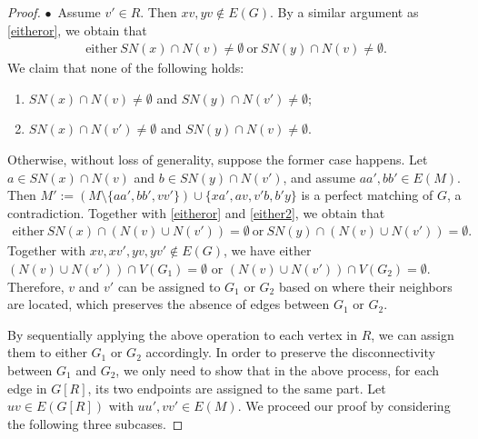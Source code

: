\documentclass[10pt,a4paper]{amsart}
\begin{document}
\begin{proof}
$\bullet$\ Assume  $v'\in R$. Then $xv,yv\notin E(G)$. By a similar argument as \eqref{eitheror}, we obtain that
\begin{align}\label{either2}
    \text{either}\ SN(x)\cap N(v)\ne \emptyset\ \text{or}\ SN(y)\cap N(v)\ne \emptyset. 
\end{align}
We claim that 
none of the following holds:
\begin{enumerate}
    \item[{\rm (1)}] $SN(x)\cap N(v)\ne \emptyset$ and $SN(y)\cap N(v')\neq \emptyset$;
    \item[{\rm (2)}] $SN(x)\cap N(v')\ne\emptyset$ and $SN(y)\cap N(v)\ne \emptyset$. 
\end{enumerate}
Otherwise, without loss of generality, suppose the former case happens. Let $a\in SN(x)\cap N(v)$ and $b\in SN(y)\cap N(v')$, and assume  $aa',bb'\in E(M)$. Then $M':=(M\setminus\{aa',bb',vv'\})\cup \{xa',av,v'b,b'y\}$ is a perfect matching of $G$, a contradiction. Together with \eqref{eitheror} and \eqref{either2}, we obtain that 
\begin{align}\label{belong}
    \text{either}\ SN(x)\cap (N(v)\cup N(v'))= \emptyset\ \text{or}\ SN(y)\cap (N(v)\cup N(v'))= \emptyset.
\end{align}
Together with $xv,xv',yv,yv'\notin E(G)$, we have either $(N(v)\cup N(v'))\cap V(G_1)=\emptyset$ or $(N(v)\cup N(v'))\cap V(G_2)=\emptyset$. Therefore, $v$ and $v'$ can be assigned to $G_1$ or $G_2$ based on where their neighbors are located, which preserves the absence of edges between $G_1$ or $G_2$. %

By sequentially applying the above operation to each vertex in 
$R$, we can assign them to either 
$G_1$ or $G_2$ accordingly. In order to preserve the disconnectivity  between $G_1$ and $G_2$, we only need to show that in the above process, for each edge in $G[R]$, %
its two endpoints are assigned to the same part. Let $uv\in E(G[R])$ with $uu',vv'\in E(M)$. We proceed our proof by considering the following three subcases.





\end{proof}
\end{document}
